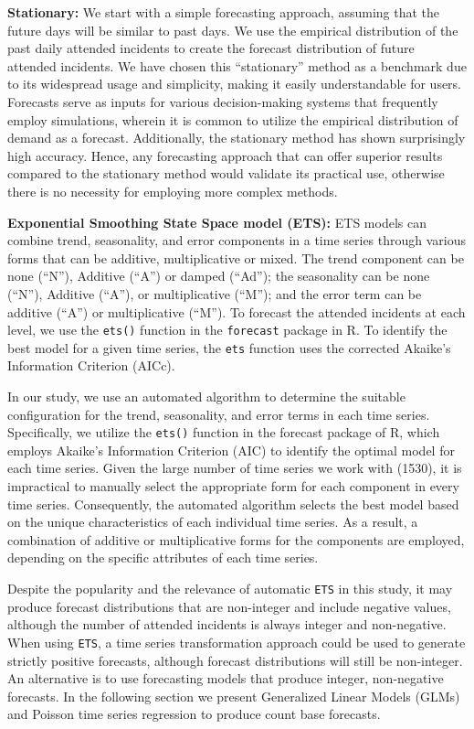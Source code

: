 \documentclass[
  authoryear,
  preprint,
  3p]{elsarticle}
\begin{document}
\textbf{Stationary:} We start with a simple forecasting approach,
assuming that the future days will be similar to past days. We use the
empirical distribution of the past daily attended incidents to create
the forecast distribution of future attended incidents. We have chosen
this ``stationary'' method as a benchmark due to its widespread usage
and simplicity, making it easily understandable for users. Forecasts
serve as inputs for various decision-making systems that frequently
employ simulations, wherein it is common to utilize the empirical
distribution of demand as a forecast. Additionally, the stationary
method has shown surprisingly high accuracy. Hence, any forecasting
approach that can offer superior results compared to the stationary
method would validate its practical use, otherwise there is no necessity
for employing more complex methods.

\textbf{Exponential Smoothing State Space model (ETS):} ETS models
\citep{hyndman2021forecasting} can combine trend, seasonality, and error
components in a time series through various forms that can be additive,
multiplicative or mixed. The trend component can be none (``N''),
Additive (``A'') or damped (``Ad''); the seasonality can be none
(``N''), Additive (``A''), or multiplicative (``M''); and the error term
can be additive (``A'') or multiplicative (``M''). To forecast the
attended incidents at each level, we use the \texttt{ets()} function in
the \texttt{forecast} package \citep{Rforecast, HK08} in R. To identify
the best model for a given time series, the \texttt{ets} function uses
the corrected Akaike's Information Criterion (AICc).

In our study, we use an automated algorithm to determine the suitable
configuration for the trend, seasonality, and error terms in each time
series. Specifically, we utilize the \texttt{ets()} function in the
forecast package of R, which employs Akaike's Information Criterion
(AIC) to identify the optimal model for each time series. Given the
large number of time series we work with (1530), it is impractical to
manually select the appropriate form for each component in every time
series. Consequently, the automated algorithm selects the best model
based on the unique characteristics of each individual time series. As a
result, a combination of additive or multiplicative forms for the
components are employed, depending on the specific attributes of each
time series.

Despite the popularity and the relevance of automatic \texttt{ETS} in
this study, it may produce forecast distributions that are non-integer
and include negative values, although the number of attended incidents
is always integer and non-negative. When using \texttt{ETS}, a time
series transformation approach could be used to generate strictly
positive forecasts, although forecast distributions will still be
non-integer. An alternative is to use forecasting models that produce
integer, non-negative forecasts. In the following section we present
Generalized Linear Models (GLMs) and Poisson time series regression to
produce count base forecasts.
\end{document}
